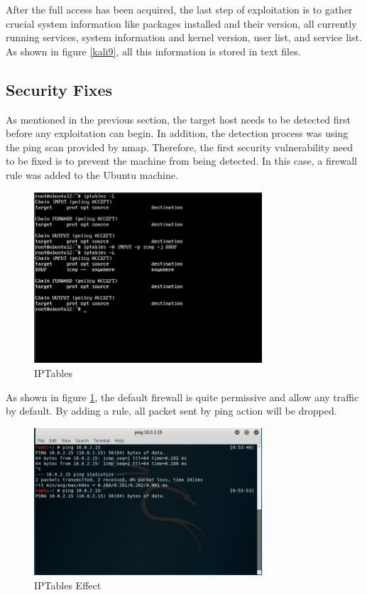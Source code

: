 \documentclass{article}
\begin{document}
After the full access has been acquired, the last step of exploitation is to gather crucial system information 
like packages installed and their version, all currently running services, system information and kernel version, 
user list, and service list.
As shown in figure \ref{kali9}, all this information is stored in text files.


\subsection{Security Fixes}
As mentioned in the previous section, the target host needs to be detected first before any exploitation can begin.
In addition, the detection process was using the ping scan provided by nmap. Therefore, the first security vulnerability 
need to be fixed is to prevent the machine from being detected. In this case, a firewall rule was added to the Ubuntu 
machine.

\begin{figure}[H]
  \includegraphics[width=8.5cm]{ubuntu4}
  \caption{IPTables}
  \label{ubuntu4}
\end{figure}

As shown in figure \ref{ubuntu4}, the default firewall is quite permissive and allow any traffic by default. 
By adding a rule, all packet sent by ping action will be dropped. 

\begin{figure}[H]
  \includegraphics[width=8.5cm]{kali10}
  \caption{IPTables Effect}
  \label{kali10}
\end{figure}
\end{document}
